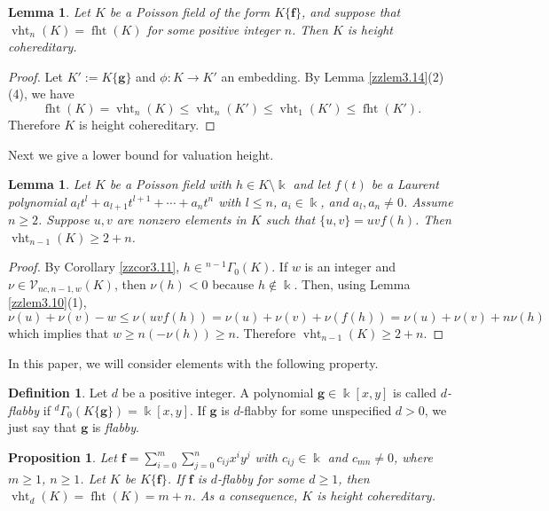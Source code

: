\documentclass[12pt]{amsart}
\theoremstyle{plain}
\newtheorem{lemma}[theorem]{Lemma}
\newtheorem{proposition}[theorem]{Proposition}
\numberwithin{theorem}{section}
\numberwithin{equation}{theorem}
\theoremstyle{definition}
\newtheorem{definition}[theorem]{Definition}
\DeclareMathOperator{\fht}{fht}
\DeclareMathOperator{\vht}{vht}
\newcommand \bff {{\mathbf{f}}}
\newcommand \bfg {{\mathbf{g}}}
\begin{document}
\begin{lemma}
\label{zzlem3.15}
Let $K$ be a Poisson field of the form $K\{\bff\}$, and suppose that $\vht_n(K)=\fht(K)$ for some positive integer $n$. Then $K$ is height cohereditary. 
\end{lemma}


\begin{proof}
Let $K' := K\{\bfg\}$ and $\phi: K\to K'$ an embedding.
By Lemma \ref{zzlem3.14}(2)(4),
we have
$$\fht(K)=\vht_n(K)\leq \vht_n(K') \leq \vht_1(K')\leq \fht(K').$$
Therefore $K$ is height cohereditary.
\end{proof}


Next we give a lower bound for valuation height.

\begin{lemma}  
\label{zzlem3.16}
Let $K$ be a Poisson field with $h\in K\setminus \Bbbk$ 
and let $f(t)$ be a Laurent polynomial
$a_{l}t^l+a_{l+1} t^{l+1}+\cdots+ a_{n} t^n$ with 
$l\leq n$, $a_i\in \Bbbk$, and $a_{l}, a_{n}\neq 0$.
Assume $n\geq 2$.
Suppose $u,v$ are nonzero elements in $K$ such that
$\{u,v\}=uv f(h)$. Then $\vht_{n-1}(K)\geq 2+n$.
\end{lemma}

\begin{proof} By Corollary \ref{zzcor3.11},
$h\in {^{n-1}\Gamma}_0(K)$. If $w$ is an integer and 
$\nu\in {\mathcal V}_{nc,n-1,w}(K)$, then 
$\nu(h)<0$ because $h \notin \Bbbk$. Then, using Lemma \ref{zzlem3.10}(1),
$$\nu(u)+\nu(v)-w \leq \nu(uv f(h))=
\nu(u)+\nu(v)+\nu(f(h))=
\nu(u)+\nu(v)+n \nu(h)$$
which implies that $w\geq n(-\nu(h))\geq n$. Therefore
$\vht_{n-1}(K)\geq 2+n$.
\end{proof}

In this paper, we will consider elements with the 
following property.

\begin{definition}
\label{zzdef3.17}
Let $d$ be a positive integer. 
A polynomial $\bfg\in \Bbbk[x,y]$ is called {\it $d$-flabby} if 
${^d\Gamma}_{0}(K\{\bfg\})=\Bbbk[x,y]$.  If $\bfg$ is $d$-flabby for some unspecified $d>0$, we just say that $\bfg$ is \emph{flabby}.
\end{definition}

\begin{proposition}
\label{zzpro3.18}
Let $\bff=\sum_{i=0}^m \sum_{j=0}^n c_{ij} x^i y^j$ with $c_{ij} \in \Bbbk$ and
$c_{mn}\neq 0$, where $m\geq 1$, $n\geq 1$. Let $K$ be 
$K\{\bff\}$. If $\bff$ is $d$-flabby for some $d\geq 1$, then 
$\vht_d(K)=\fht(K)=m+n$. 
As a consequence, $K$ is height cohereditary. 
\end{proposition}
\end{document}

